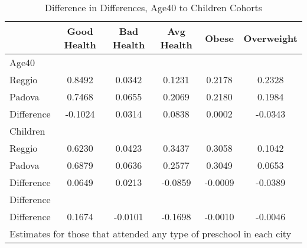 \begin{table}[htbp]\centering
\caption{Difference in Differences, Age40 to Children Cohorts}
\begin{tabular}{l*{5}{c}}
\hline\hline
            & Good Health&  Bad Health&  Avg Health&       Obese&  Overweight\\
\hline
Age40       &            &            &            &            &            \\
Reggio      &      0.8492&      0.0342&      0.1231&      0.2178&      0.2328\\
Padova      &      0.7468&      0.0655&      0.2069&      0.2180&      0.1984\\
Difference  &     -0.1024&      0.0314&      0.0838&      0.0002&     -0.0343\\
\hline
Children    &            &            &            &            &            \\
Reggio      &      0.6230&      0.0423&      0.3437&      0.3058&      0.1042\\
Padova      &      0.6879&      0.0636&      0.2577&      0.3049&      0.0653\\
Difference  &      0.0649&      0.0213&     -0.0859&     -0.0009&     -0.0389\\
\hline
Difference  &            &            &            &            &            \\
Difference  &      0.1674&     -0.0101&     -0.1698&     -0.0010&     -0.0046\\
\hline\hline
\multicolumn{6}{l}{\footnotesize Estimates for those that attended any type of preschool in each city}\\
\end{tabular}
\end{table}
